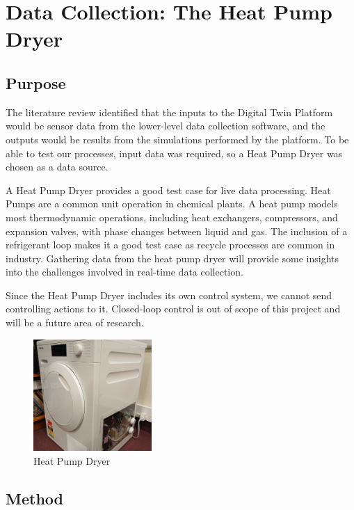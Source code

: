 \chapter{Data Collection: The Heat Pump Dryer} \label{sec:heatpumpcollection}

\section{Purpose}

The literature review identified that the inputs to the Digital Twin Platform would be sensor data from the lower-level data collection software, and the outputs would be results from  the simulations performed by the platform. To be able to test our processes, input data was required, so a Heat Pump Dryer was chosen as a data source.

A Heat Pump Dryer provides a good test case for live data processing. Heat Pumps are a common unit operation in chemical plants. A heat pump models most thermodynamic operations, including heat exchangers, compressors, and expansion valves, with phase changes between liquid and gas. 
The inclusion of a refrigerant loop makes it a good test case as recycle processes are common in industry. 
Gathering data from the heat pump dryer will provide some insights into the challenges involved in real-time data collection.

Since the Heat Pump Dryer includes its own control system, we cannot send controlling actions to it. Closed-loop control is out of scope of this project and will be a future area of research.

\begin{figure}
    \centering
    \includegraphics[width=0.4\textwidth]{dryer.png}
    \caption{Heat Pump Dryer}
    \label{fig:dryer}
\end{figure}

\section{Method}


